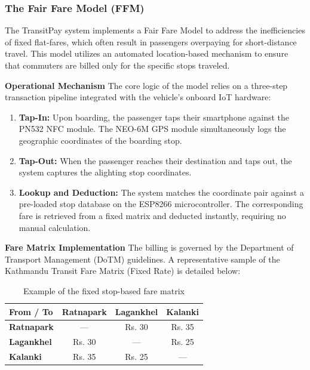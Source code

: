 \documentclass[manuscript,review,anonymous]{acmart}
\begin{document}
\subsubsection{The Fair Fare Model (FFM)}

The TransitPay system implements a Fair Fare Model to address the inefficiencies of fixed flat-fares, which often result in passengers overpaying for short-distance travel. This model utilizes an automated location-based mechanism to ensure that commuters are billed only for the specific stops traveled.

\textbf{Operational Mechanism}
The core logic of the model relies on a three-step transaction pipeline integrated with the vehicle's onboard IoT hardware:

\begin{enumerate}
    \item \textbf{Tap-In:} Upon boarding, the passenger taps their smartphone against the PN532 NFC module. The NEO-6M GPS module simultaneously logs the geographic coordinates of the boarding stop.
    \item \textbf{Tap-Out:} When the passenger reaches their destination and taps out, the system captures the alighting stop coordinates.
    \item \textbf{Lookup and Deduction:} The system matches the coordinate pair against a pre-loaded stop database on the ESP8266 microcontroller. The corresponding fare is retrieved from a fixed matrix and deducted instantly, requiring no manual calculation.
\end{enumerate}

\textbf{Fare Matrix Implementation}
The billing is governed by the Department of Transport Management (DoTM) guidelines. A representative sample of the Kathmandu Transit Fare Matrix (Fixed Rate) is detailed below:

\begin{table}[H]
  \centering
  \caption{Example of the fixed stop-based fare matrix}
  \label{tab:lagankhel_fare_matrix}
  \begin{tabular}{lccc}
    \toprule
    \textbf{From / To} & \textbf{Ratnapark} & \textbf{Lagankhel} & \textbf{Kalanki}\\
    \midrule
    \textbf{Ratnapark} & — & Rs. 30 & Rs. 35 \\
    \textbf{Lagankhel} & Rs. 30 & — & Rs. 25 \\
    \textbf{Kalanki}   & Rs. 35 & Rs. 25 & — \\
    \bottomrule
   \end{tabular}
\end{table}
\end{document}

